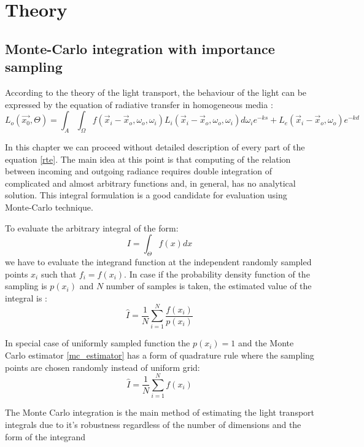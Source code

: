 \chapter{Theory}
\label{chapter:theory}

\section{Monte-Carlo integration with importance sampling}
\label{section:importance_sampling}
According to the theory of the light transport, the behaviour of the light can be expressed by the
equation of radiative transfer in homogeneous media \cite{Lafortune:1996:RPM:275458.275468}:
\begin{equation}
\label{rte}
L_o(\vec{x_0}, \Theta) = \int_{A} \int_{\Omega} f(\vec{x}_i-\vec{x}_o,\omega_o,\omega_i)
L_i(\vec{x}_i-\vec{x}_o, \omega_o, \omega_i) d\omega_i e^{-ks} + L_e(\vec{x}_i-\vec{x}_o, \omega_o)
e^{-kd}
\end{equation}

In this chapter we can proceed without detailed description of every part of the equation \ref{rte}.
The main idea at this point is that computing of the relation between incoming and outgoing radiance
requires double integration of complicated and almost arbitrary functions and, in general, has no
analytical solution. This integral formulation is a good candidate for evaluation using Monte-Carlo
technique.

To evaluate the arbitrary integral of the form:
\[
I = \int_\Theta f(x) dx
\]
we have to evaluate the integrand function at the independent randomly sampled points $x_i$ such
that $f_i = f(x_i)$. In case if the probability density function of the sampling is $p(x_i)$ and $N$
number of samples is taken, the estimated value of the integral is \cite{hammersley64}:
\begin{equation}
\label{mc_estimator}
\hat{I}=\frac{1}{N}\sum_{i=1}^N\frac{f(x_i)}{p(x_i)}
\end{equation}

In special case of uniformly sampled function the $p(x_i)=1$ and the Monte Carlo estimator
\ref{mc_estimator} has a form of quadrature rule where the sampling points are chosen randomly
instead of uniform grid:
\begin{equation}
\label{uniform_estimator}
\hat{I}=\frac{1}{N}\sum_{i=1}^N f(x_i)
\end{equation}

The Monte Carlo integration is the main method of estimating the light transport integrals due to
it's robustness regardless of the number of dimensions and the form of the integrand
\cite{Veach:1998:RMC:927297}

